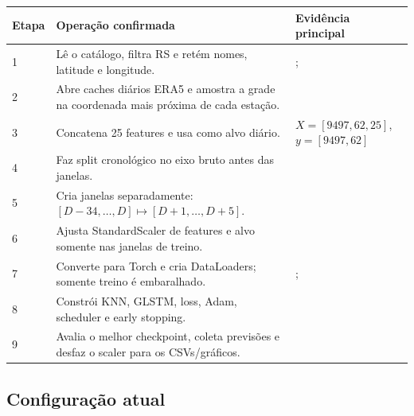 \documentclass[11pt,a4paper]{article}
\newcommand{\code}[1]{\texttt{\detokenize{#1}}}
\begin{document}
\begin{center}
\begin{tabularx}{0.98\textwidth}{@{}p{}Y p{0.25\textwidth}@{}}
\toprule
\textbf{Etapa} & \textbf{Operação confirmada} & \textbf{Evidência principal} \\
 & Lê o catálogo, filtra RS e retém nomes, latitude e longitude. &
;  \\
2 & Abre caches diários ERA5 e amostra a grade na coordenada mais próxima de cada estação. &
 \\
3 & Concatena 25 features e usa \code{tp} como alvo diário. &
$X=[9497,62,25]$, $y=[9497,62]$ \\
4 & Faz split cronológico no eixo bruto antes das janelas. &
 \\
5 & Cria janelas separadamente: $[D-34,\ldots,D]\mapsto[D+1,\ldots,D+5]$. &
 \\
6 & Ajusta StandardScaler de features e alvo somente nas janelas de treino. &
 \\
7 & Converte para Torch e cria DataLoaders; somente treino é embaralhado. &
;  \\
8 & Constrói KNN, GLSTM, loss, Adam, scheduler e early stopping. &
 \\
9 & Avalia o melhor checkpoint, coleta previsões e desfaz o scaler para os CSVs/gráficos. &
 \\
\bottomrule
\end{tabularx}
\end{center}

\subsection{Configuração atual}
\end{document}
